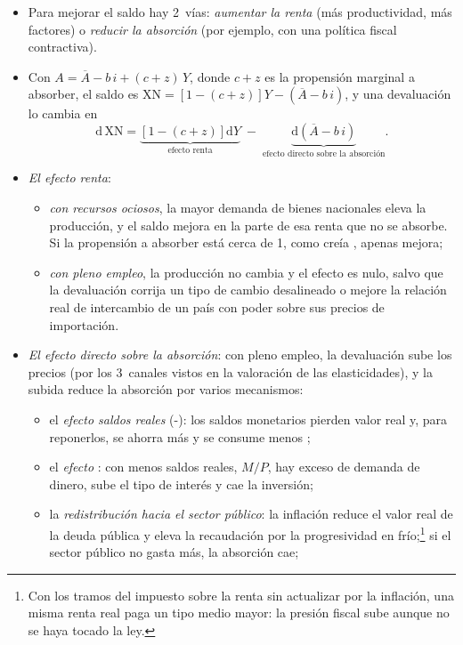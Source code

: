 \documentclass[11pt]{article}
\begin{document}
\begin{itemize}
\item Para mejorar el saldo hay 2~vías: \emph{aumentar la renta} (más productividad, más factores) o \emph{reducir la absorción} (por ejemplo, con una política fiscal contractiva).
\item Con $A=\overline A-b\,i+(c+z)\,Y$, donde $c+z$ es la propensión marginal a absorber, el saldo es $\mathrm{XN}=\left[1-(c+z)\right]Y-\left(\overline A-b\,i\right)$, y una devaluación lo cambia en
  \begin{equation}\label{eq:absorcion-devaluacion}
  \mathrm d\,\mathrm{XN}=\underbrace{\left[1-(c+z)\right]\mathrm dY}_{\text{efecto renta}}\;-\;\underbrace{\mathrm d\left(\overline A-b\,i\right)}_{\text{efecto directo sobre la absorción}} .
  \end{equation}
\item \emph{El efecto renta}:
  \begin{itemize}
  \item \emph{con recursos ociosos}, la mayor demanda de bienes nacionales eleva la producción, y el saldo mejora en la parte de esa renta que no se absorbe. Si la propensión a absorber está cerca de 1, como creía , apenas mejora;
  \item \emph{con pleno empleo}, la producción no cambia y el efecto es nulo, salvo que la devaluación corrija un tipo de cambio desalineado o mejore la relación real de intercambio de un país con poder sobre sus precios de importación.
  \end{itemize}
\item \emph{El efecto directo sobre la absorción}: con pleno empleo, la devaluación sube los precios (por los 3~canales vistos en la valoración de las elasticidades), y la subida reduce la absorción por varios mecanismos\nocite{Alexander1952Effects}:
  \begin{itemize}
  \item el \emph{efecto saldos reales} (-): los saldos monetarios pierden valor real y, para reponerlos, se ahorra más y se consume menos ;
  \item el \emph{efecto }: con menos saldos reales, $M/P$, hay exceso de demanda de dinero, sube el tipo de interés y cae la inversión;
  \item la \emph{redistribución hacia el sector público}: la inflación reduce el valor real de la deuda pública y eleva la recaudación por la progresividad en frío;\footnote{Con los tramos del impuesto sobre la renta sin actualizar por la inflación, una misma renta real paga un tipo medio mayor: la presión fiscal sube aunque no se haya tocado la ley.} si el sector público no gasta más, la absorción cae;

\end{itemize}
\end{itemize}
\end{document}
